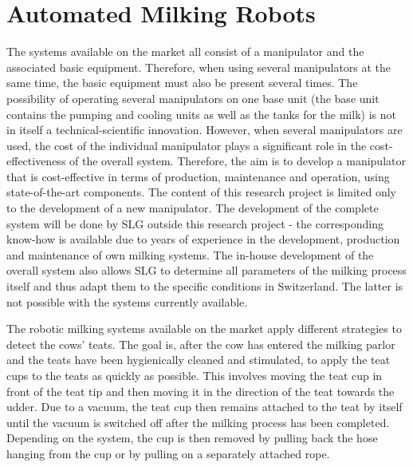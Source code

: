 \section{Automated Milking Robots}\label{chap:2:melkroboter}
The systems available on the market all consist of a manipulator and the associated basic equipment. Therefore, when using several manipulators at the same time, the basic equipment must also be present several times. The possibility of operating several manipulators on one base unit (the base unit contains the pumping and cooling units as well as the tanks for the milk) is not in itself a technical-scientific innovation. However, when several manipulators are used, the cost of the individual manipulator plays a significant role in the cost-effectiveness of the overall system. Therefore, the aim is to develop a manipulator that is cost-effective in terms of production, maintenance and operation, using state-of-the-art components. The content of this research project is limited only to the development of a new manipulator. The development of the complete system will be done by SLG outside this research project - the corresponding know-how is available due to years of experience in the development, production and maintenance of own milking systems. The in-house development of the overall system also allows SLG to determine all parameters of the milking process itself and thus adapt them to the specific conditions in Switzerland. The latter is not possible with the systems currently available.

The robotic milking systems available on the market apply different strategies to detect the cows' teats. The goal is, after the cow has entered the milking parlor and the teats have been hygienically cleaned and stimulated, to apply the teat cups to the teats as quickly as possible. This involves moving the teat cup in front of the teat tip and then moving it in the direction of the teat towards the udder. Due to a vacuum, the teat cup then remains attached to the teat by itself until the vacuum is switched off after the milking process has been completed. Depending on the system, the cup is then removed by pulling back the hose hanging from the cup or by pulling on a separately attached rope.


